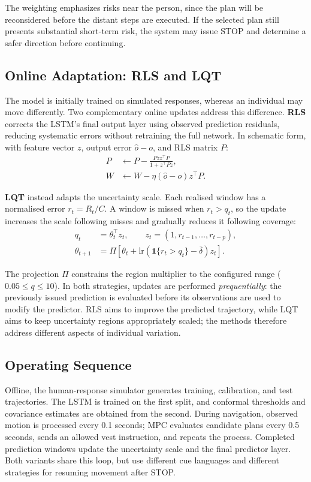 \documentclass[11pt,a4paper]{article}
\begin{document}
The weighting emphasizes risks near the person, since the plan will be reconsidered before the distant steps are executed. If the selected plan still presents substantial short-term risk, the system may issue STOP and determine a safer direction before continuing.

\subsection{Online Adaptation: RLS and LQT}
\label{sec:adapt}

The model is initially trained on simulated responses, whereas an individual may move differently. Two complementary online updates address this difference. \textbf{RLS} corrects the LSTM's final output layer using observed prediction residuals, reducing systematic errors without retraining the full network. In schematic form, with feature vector $z$, output error $\hat o-o$, and RLS matrix $P$:
\begin{align}
 P&\leftarrow P-\frac{Pzz^\top P}{1+z^\top Pz},\\
 W&\leftarrow W-\eta(\hat o-o)z^\top P.
\end{align}

\textbf{LQT} instead adapts the uncertainty scale. Each realised window has a normalised error $r_t=R_t/C$. A window is missed when $r_t>q_t$, so the update increases the scale following misses and gradually reduces it following coverage:
\begin{align}
 q_t&=\theta_t^\top z_t,\qquad
 z_t=(1,r_{t-1},\ldots,r_{t-p}),\\
 \theta_{t+1}&=\Pi\!\left[\theta_t+
 \mathrm{lr}\left(\mathbf1\{r_t>q_t\}-\bar\delta\right)z_t\right].
\end{align}

The projection $\Pi$ constrains the region multiplier to the configured range ($0.05\le q\le10$). In both strategies, updates are performed \emph{prequentially}: the previously issued prediction is evaluated before its observations are used to modify the predictor. RLS aims to improve the predicted trajectory, while LQT aims to keep uncertainty regions appropriately scaled; the methods therefore address different aspects of individual variation.

\subsection{Operating Sequence}
\label{sec:workflow}

Offline, the human-response simulator generates training, calibration, and test trajectories. The LSTM is trained on the first split, and conformal thresholds and covariance estimates are obtained from the second. During navigation, observed motion is processed every 0.1 seconds; MPC evaluates candidate plans every 0.5 seconds, sends an allowed vest instruction, and repeats the process. Completed prediction windows update the uncertainty scale and the final predictor layer. Both variants share this loop, but use different cue languages and different strategies for resuming movement after STOP.
\end{document}
